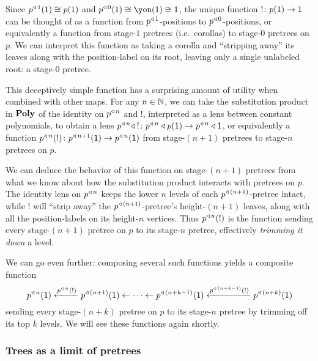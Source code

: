 \documentclass[Book-Poly]{subfiles}
\begin{document}
\begin{example} \label{ex.trim}
Since $p^{\mathbin{\triangleleft}\,1}(\textsf{1})\cong p(\textsf{1})$ and $p\tripow0(\1)\iso\yon(\1)\iso\1$, the unique function $!\colon p(\textsf{1})\to\textsf{1}$ can be thought of as a function from $p^{\mathbin{\triangleleft}\,1}$-positions to $p^{\mathbin{\triangleleft}\,0}$-positions, or equivalently a function from stage-$1$ pretrees (i.e.\ corollas) to stage-$0$ pretrees on $p$.
We can interpret this function as taking a corolla and ``stripping away'' its leaves along with the position-label on its root, leaving only a single unlabeled root: a stage-$0$ pretree.

This deceptively simple function has a surprising amount of utility when combined with other maps.
For any $n\in\mathbb{N}$, we can take the substitution product in $\mathbf{Poly}$ of the identity on $p^{\mathbin{\triangleleft}\,n}$ and $!$, interpreted as a lens between constant polynomials, to obtain a lens $p^{\mathbin{\triangleleft}\,n}\mathbin{\triangleleft} \:!\colon p^{\mathbin{\triangleleft}\,n}\mathbin{\triangleleft} p(\textsf{1})\to p^{\mathbin{\triangleleft}\,n}\mathbin{\triangleleft}\textsf{1}$, or equivalently a function $p^{\mathbin{\triangleleft}\,n}(!)\colon p^{\mathbin{\triangleleft}\,n+1}(\textsf{1})\to p^{\mathbin{\triangleleft}\,n}(\textsf{1})$ from stage-$(n+1)$ pretrees to stage-$n$ pretrees on $p$.

We can deduce the behavior of this function on stage-$(n+1)$ pretrees from what we know about how the substitution product interacts with pretrees on $p$.
The identity lens on $p^{\mathbin{\triangleleft}\,n}$ keeps the lower $n$ levels of each $p^{\mathbin{\triangleleft}\,(n+1)}$-pretree intact, while $!$ will ``strip away'' the $p^{\mathbin{\triangleleft}\,(n+1)}$-pretree's height-$(n+1)$ leaves, along with all the position-labels on its height-$n$ vertices.
Thus $p^{\mathbin{\triangleleft}\,n}(!)$ is the function sending every stage-$(n+1)$ pretree on $p$ to its stage-$n$ pretree, effectively \emph{trimming it down} a level.

We can go even further: composing several such functions yields a composite function
\begin{equation} \label{eqn.trim}
    p^{\mathbin{\triangleleft}\,n}(\textsf{1}) \xleftarrow{p^{\mathbin{\triangleleft}\,n}(!)}
	p^{\mathbin{\triangleleft}\,(n+1)}(\textsf{1}) \leftarrow\cdots\leftarrow
	p^{\mathbin{\triangleleft}\,(n+k-1)}(\textsf{1}) \xleftarrow{p^{\mathbin{\triangleleft}\,(n+k-1)}(!)}
	p^{\mathbin{\triangleleft}\,(n+k)}(\textsf{1})
\end{equation}
sending every stage-$(n+k)$ pretree on $p$ to its stage-$n$ pretree by trimming off its top $k$ levels.
We will see these functions again shortly.
\end{example}


\subsubsection{Trees as a limit of pretrees}
\end{document}
